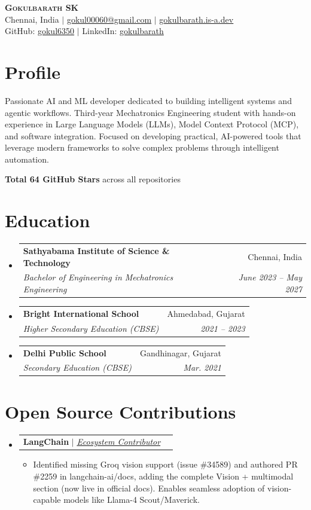 \documentclass[letterpaper,11pt]{article}
\makeatletter
\newcommand{\resumeItem}[1]{
  \item\small{
    {#1 \vspace{-2pt}}
  }
}
\newcommand{\resumeSubheading}[4]{
  \vspace{-2pt}\item
    \begin{tabular*}{0.97\textwidth}[t]{l@{\extracolsep{\fill}}r}
      \textbf{#1} & \color{ResumeGray}#2 \\
      \textit{\small#3} & \color{ResumeGray}\textit{\small #4} \\
    \end{tabular*}\vspace{-7pt}
}
\newcommand{\resumeProjectHeading}[2]{
    \item
    \begin{tabular*}{0.97\textwidth}{l@{\extracolsep{\fill}}r}
      \small#1 & #2 \\
    \end{tabular*}\vspace{-7pt}
}
\newcommand{\resumeSubHeadingListStart}{\begin{itemize}[leftmargin=0.15in, label={}]}
\newcommand{\resumeSubHeadingListEnd}{\end{itemize}}
\newcommand{\resumeItemListStart}{\begin{itemize}}
\newcommand{\resumeItemListEnd}{\end{itemize}\vspace{-5pt}}
\makeatother
\begin{document}
\begin{center}
    \textbf{\Huge \scshape Gokulbarath SK} \\ \vspace{2pt}
    \small Chennai, India $|$ \href{mailto:gokul00060@gmail.com}{\underline{gokul00060@gmail.com}} $|$ 
    \href{https://gokulbarath.is-a.dev}{\underline{gokulbarath.is-a.dev}} \\ \vspace{2pt}
    \small GitHub: \href{https://github.com/gokul6350}{\underline{gokul6350}} $|$ LinkedIn: \href{https://linkedin.com/in/gokulbarath}{\underline{gokulbarath}}
\end{center}


\section{Profile}
    \small{Passionate AI and ML developer dedicated to building intelligent systems and agentic workflows. Third-year Mechatronics Engineering student with hands-on experience in Large Language Models (LLMs), Model Context Protocol (MCP), and software integration. Focused on developing practical, AI-powered tools that leverage modern frameworks to solve complex problems through intelligent automation.}
    
    \vspace{2pt}
    \small{\textbf{Total 64 GitHub Stars} across all repositories}
    \vspace{7pt}

\section{Education}
  \resumeSubHeadingListStart
    \resumeSubheading
      {Sathyabama Institute of Science \& Technology}{Chennai, India}
      {Bachelor of Engineering in Mechatronics Engineering}{June 2023 -- May 2027}
    \resumeSubheading
      {Bright International School}{Ahmedabad, Gujarat}
      {Higher Secondary Education (CBSE)}{2021 -- 2023}
    \resumeSubheading
      {Delhi Public School}{Gandhinagar, Gujarat}
      {Secondary Education (CBSE)}{Mar. 2021}
  \resumeSubHeadingListEnd


\section{Open Source Contributions}
  \resumeSubHeadingListStart
    \resumeProjectHeading
      {\textbf{LangChain} $|$ \href{https://github.com/gokul6350?tab=overview\&org=langchain-ai}{\emph{Ecosystem Contributor}}}{}
      \resumeItemListStart
        \resumeItem{Identified missing Groq vision support (issue \#34589) and authored PR \#2259 in langchain-ai/docs, adding the complete Vision + multimodal section (now live in official docs). Enables seamless adoption of vision-capable models like Llama-4 Scout/Maverick.}
      \resumeItemListEnd
  \resumeSubHeadingListEnd
\end{document}

